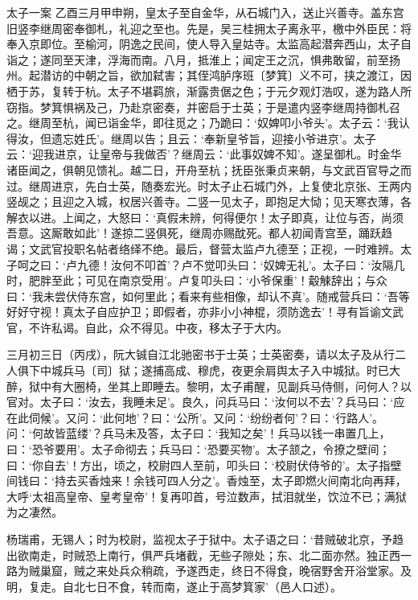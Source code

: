 \documentclass[]{article}
\begin{document}
太子一案
乙酉三月甲申朔，皇太子至自金华，从石城门入，送止兴善寺。盖东宫旧竖李继周密奉御札，礼迎之至也。先是，吴三桂拥太子离永平，檄中外臣民：将奉入京即位。至榆河，阴逸之民间，使人导入皇姑寺。太监高起潜奔西山，太子自诣之；遂同至天津，浮海而南。八月，抵淮上；闻定王之沉，惧弗敢留，前至扬州。起潜访的中朝之旨，欲加弑害；其侄鸿胪序班〔梦箕〕义不可，挟之渡江，因栖于苏，复转于杭。太子不堪羁旅，渐露贵倨之色；于元夕观灯浩叹，遂为路人所窃指。梦箕惧祸及己，乃赴京密奏，并密启于士英；于是遣内竖李继周持御札召之。继周至杭，闻已诣金华，即往觅之；乃跪曰：`奴婢叩小爷头'。太子云：`我认得汝，但遗忘姓氏'。继周以告；且云：`奉新皇爷旨，迎接小爷进京'。太子云：`迎我进京，让皇帝与我做否'？继周云：`此事奴婢不知'。遂呈御札。时金华诸臣闻之，俱朝见馈礼。越二日，开舟至杭；抚臣张秉贞来朝，与文武百官导之而过。继周进京，先白士英，随奏宏光。时太子止石城门外，上复使北京张、王两内竖觇之；且迎之入城，权居兴善寺。二竖一见太子，即抱足大恸；见天寒衣薄，各解衣以进。上闻之，大怒曰：`真假未辨，何得便尔！太子即真，让位与否，尚须吾意。这厮敢如此'！遂掠二竖俱死，继周亦赐酖死。都人初闻青宫至，踊跃趋谒；文武官投职名帖者络绎不绝。最后，督营太监卢九德至；正视，一时难辨。太子呵之曰：`卢九德！汝何不叩首'？卢不觉叩头曰：`奴婢无礼'。太子曰：`汝隔几时，肥胖至此；可见在南京受用'。卢复叩头曰：`小爷保重'！觳觫辞出；与众曰：`我未尝伏侍东宫，如何里此；看来有些相像，却认不真'。随戒营兵曰：`吾等好好守视！真太子自应护卫；即假者，亦非小小神棍，须防逸去'！寻有旨谕文武官，不许私谒。自此，众不得见。中夜，移太子于大内。

三月初三日（丙戌），阮大铖自江北驰密书于士英；士英密奏，请以太子及从行二人俱下中城兵马〔司〕狱；遂捕高成、穆虎，夜更余肩舆太子入中城狱。时已大醉，狱中有大圈椅，坐其上即睡去。黎明，太子甫醒，见副兵马侍侧，问何人？以官对。太子曰：`汝去，我睡未足'。良久，问兵马曰：`汝何以不去'？兵马曰：`应在此伺候'。又问：`此何地'？曰：`公所'。又问：`纷纷者何'？曰：`行路人'。问：`何故皆蓝缕'？兵马未及答，太子曰：`我知之矣'！兵马以钱一串置几上，曰：`恐爷要用'。太子命彻去；兵马曰：`恐要买物'。太子颔之，令撩之壁间；曰：`你自去'！方出，顷之，校尉四人至前，叩头曰：`校尉伏侍爷的'。太子指壁间钱曰：`持去买香烛来！余钱可四人分之'。香烛至，太子即燃火间南北向再拜，大呼`太祖高皇帝、皇考皇帝'！复再叩首，号泣数声，拭泪就坐，饮泣不已；满狱为之凄然。

杨瑞甫，无锡人；时为校尉，监视太子于狱中。太子语之曰：`昔贼破北京，予趋出欲南走，时贼恐上南行，俱严兵堵截，无些子隙处；东、北二面亦然。独正西一路为贼巢窟，贼之来处兵众稍疏，予遂西走，终日不得食，晚宿野舍开浴堂家。及明，复走。自北七日不食，转而南，遂止于高梦箕家'（邑人口述）。
\end{document}
